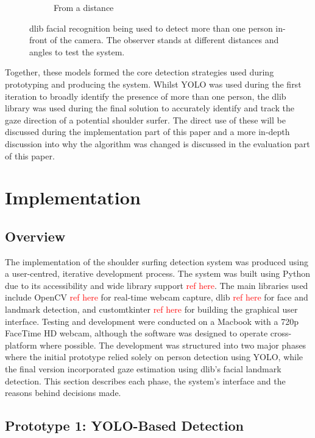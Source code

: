 \documentclass[12pt]{article}
\theoremstyle{plain}
\theoremstyle{definition}
\begin{document}
\begin{figure}[h!]
\begin{subfigure}[b]{0.3\textwidth}
         \caption{From a distance}
         \label{fig:face_c}
     \end{subfigure}
        \caption{dlib facial recognition being used to detect more than one person in-front of the camera. The observer stands at different distances and angles to test the system.}
        \label{fig:dlib}
\end{figure}

Together, these models formed the core detection strategies used during prototyping and producing the system. Whilst YOLO was used during the first iteration to broadly identify the presence of more than one person, the dlib library was used during the final solution to accurately identify and track the gaze direction of a potential shoulder surfer. The direct use of these will be discussed during the implementation part of this paper and a more in-depth discussion into why the algorithm was changed is discussed in the evaluation part of this paper.

\section{Implementation}
\label{implementation}

\subsection{Overview}
\label{imp_overview}

The implementation of the shoulder surfing detection system was produced using a user-centred, iterative development process. The system was built using Python due to its accessibility and wide library support \textcolor{red}{ref here}. The main libraries used include OpenCV \textcolor{red}{ref here} for real-time webcam capture, dlib \textcolor{red}{ref here} for face and landmark detection, and customtkinter \textcolor{red}{ref here} for building the graphical user interface. Testing and development were conducted on a Macbook with a 720p FaceTime HD webcam, although the software was designed to operate cross-platform where possible.
The development was structured into two major phases where the initial prototype relied solely on person detection using YOLO, while the final version incorporated gaze estimation using dlib’s facial landmark detection. This section describes each phase, the system’s interface and the reasons behind decisions made.

\subsection{Prototype 1: YOLO-Based Detection}
\label{prototype_1}
\end{document}

